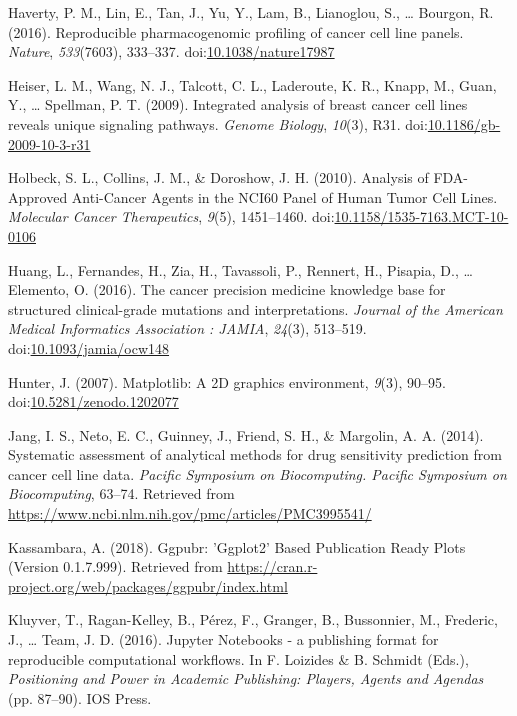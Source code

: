 \documentclass[man]{apa6}
\begin{document}
\hypertarget{ref-haverty2016}{}
Haverty, P. M., Lin, E., Tan, J., Yu, Y., Lam, B., Lianoglou, S.,
\ldots{} Bourgon, R. (2016). Reproducible pharmacogenomic profiling of
cancer cell line panels. \emph{Nature}, \emph{533}(7603), 333--337.
doi:\href{https://doi.org/10.1038/nature17987}{10.1038/nature17987}

\hypertarget{ref-heiser2009}{}
Heiser, L. M., Wang, N. J., Talcott, C. L., Laderoute, K. R., Knapp, M.,
Guan, Y., \ldots{} Spellman, P. T. (2009). Integrated analysis of breast
cancer cell lines reveals unique signaling pathways. \emph{Genome
Biology}, \emph{10}(3), R31.
doi:\href{https://doi.org/10.1186/gb-2009-10-3-r31}{10.1186/gb-2009-10-3-r31}

\hypertarget{ref-holbeck2010}{}
Holbeck, S. L., Collins, J. M., \& Doroshow, J. H. (2010). Analysis of
FDA-Approved Anti-Cancer Agents in the NCI60 Panel of Human Tumor Cell
Lines. \emph{Molecular Cancer Therapeutics}, \emph{9}(5), 1451--1460.
doi:\href{https://doi.org/10.1158/1535-7163.MCT-10-0106}{10.1158/1535-7163.MCT-10-0106}

\hypertarget{ref-huang2016}{}
Huang, L., Fernandes, H., Zia, H., Tavassoli, P., Rennert, H., Pisapia,
D., \ldots{} Elemento, O. (2016). The cancer precision medicine
knowledge base for structured clinical-grade mutations and
interpretations. \emph{Journal of the American Medical Informatics
Association : JAMIA}, \emph{24}(3), 513--519.
doi:\href{https://doi.org/10.1093/jamia/ocw148}{10.1093/jamia/ocw148}

\hypertarget{ref-hunter2007}{}
Hunter, J. (2007). Matplotlib: A 2D graphics environment, \emph{9}(3),
90--95.
doi:\href{https://doi.org/10.5281/zenodo.1202077}{10.5281/zenodo.1202077}

\hypertarget{ref-jang2014}{}
Jang, I. S., Neto, E. C., Guinney, J., Friend, S. H., \& Margolin, A. A.
(2014). Systematic assessment of analytical methods for drug sensitivity
prediction from cancer cell line data. \emph{Pacific Symposium on
Biocomputing. Pacific Symposium on Biocomputing}, 63--74. Retrieved from
\url{https://www.ncbi.nlm.nih.gov/pmc/articles/PMC3995541/}

\hypertarget{ref-kassambara2018}{}
Kassambara, A. (2018). Ggpubr: 'Ggplot2' Based Publication Ready Plots
(Version 0.1.7.999). Retrieved from
\url{https://cran.r-project.org/web/packages/ggpubr/index.html}

\hypertarget{ref-kluyver2016}{}
Kluyver, T., Ragan-Kelley, B., Pérez, F., Granger, B., Bussonnier, M.,
Frederic, J., \ldots{} Team, J. D. (2016). Jupyter Notebooks - a
publishing format for reproducible computational workflows. In F.
Loizides \& B. Schmidt (Eds.), \emph{Positioning and Power in Academic
Publishing: Players, Agents and Agendas} (pp. 87--90). IOS Press.
\end{document}
